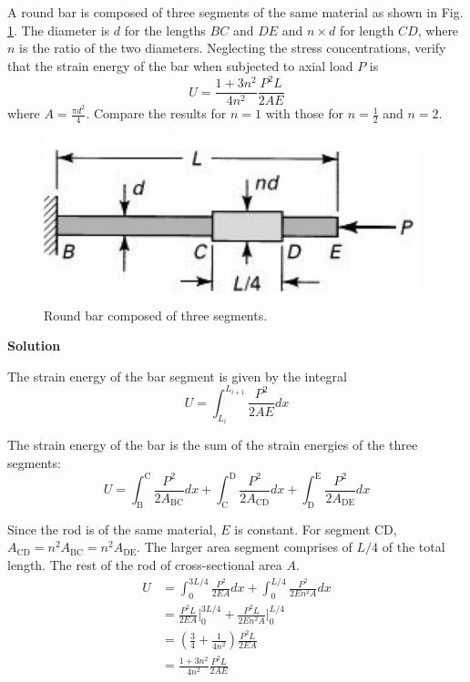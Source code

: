 \section{}

A round bar is composed of three segments of the same material as shown in Fig. \ref{fig:Q6}. The diameter
is $d$ for the lengths $BC$ and $DE$ and $n\times d$ for length $CD$, where $n$ is the ratio of the two diameters.
Neglecting the stress concentrations, verify that the strain energy of the bar when subjected to
axial load $P$ is
\[
U = \frac{1 + 3n^2}{4n^2} \frac{P^2L}{2AE}
\]
where $A = \frac{\pi d^2}{4}$. Compare the results for $n = 1$ with those for $n = \frac{1}{2}$ and $n = 2$.

\begin{figure}[h]
    \centering
    \includegraphics[width=0.5\linewidth]{Questions/Figures/Q6ProblemDiagram.png}
    \caption{Round bar composed of three segments.}
    \label{fig:Q6}
\end{figure}

\textbf{Solution}

The strain energy of the bar segment is given by the integral
\[
U = \int_{L_i}^{L_{i+1}} \frac{P^2}{2AE} dx
\]

The strain energy of the bar is the sum of the strain energies of the three segments:
\[
U = \int_{\text{B}}^{\text{C}} \frac{P^2}{2A_{\text{BC}}} dx + \int_{\text{C}}^{\text{D}} \frac{P^2}{2A_{\text{CD}}} dx 
+ \int_{\text{D}}^{\text{E}} \frac{P^2}{2A_{\text{DE}}} dx
\]

Since the rod is of the same material, $E$ is constant. For segment CD, $A_{\text{CD}} = n^2 A_{\text{BC}} = n^2 A_{\text{DE}}$.
The larger area segment comprises of $L/4$ of the total length. The rest of the rod of cross-sectional area $A$. 
\[
\begin{aligned}
    U &= \int_{0}^{3L/4} \frac{P^2}{2EA} dx + \int_{0}^{L/4} \frac{P^2}{2En^2A} dx \\
    &= \frac{P^2L}{2EA} \bigg|_0^{3L/4} + \frac{P^2L}{2En^2A} \bigg|_0^{L/4} \\
    &= \left(\frac{3}{4} + \frac{1}{4n^2}\right) \frac{P^2L}{2EA} \\
    &= \boxed{\frac{1 + 3n^2}{4n^2} \frac{P^2L}{2AE}} \\
\end{aligned}
\]

